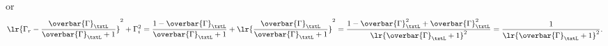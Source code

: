 {or
\begin{dmath}\label{eqn:uwavesDeck5SmithChartCore:560}
\lr{ \Gamma_r - \frac{ \overbar{\Gamma}_\txtL }{\overbar{\Gamma}_\txtL + 1} }^2 + \Gamma_i^2
=
\frac{1 - \overbar{\Gamma}_\txtL}{ \overbar{\Gamma}_\txtL + 1} + \lr{ \frac{ \overbar{\Gamma}_\txtL }{\overbar{\Gamma}_\txtL + 1} }^2
=
\frac{ 1 - \overbar{\Gamma}_\txtL^2 + \overbar{\Gamma}_\txtL^2 }{\lr{\overbar{\Gamma}_\txtL + 1}^2}
=
\frac{ 1 }{\lr{\overbar{\Gamma}_\txtL + 1}^2}.
\end{dmath}

} %

